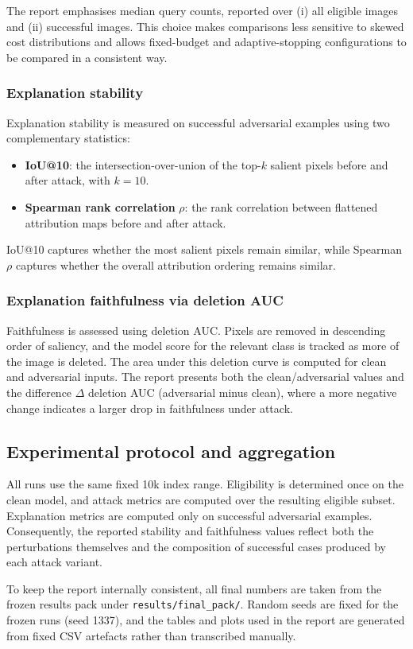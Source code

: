 The report emphasises median query counts, reported over (i) all eligible images and (ii) successful images.
This choice makes comparisons less sensitive to skewed cost distributions and allows fixed-budget and adaptive-stopping configurations to be compared in a consistent way.

\subsubsection{Explanation stability}
Explanation stability is measured on successful adversarial examples using two complementary statistics:
\begin{itemize}
  \item \textbf{IoU@10}: the intersection-over-union of the top-$k$ salient pixels before and after attack, with $k=10$.
  \item \textbf{Spearman rank correlation} $\rho$: the rank correlation between flattened attribution maps before and after attack.
\end{itemize}
IoU@10 captures whether the most salient pixels remain similar, while Spearman $\rho$ captures whether the overall attribution ordering remains similar.

\subsubsection{Explanation faithfulness via deletion AUC}
Faithfulness is assessed using deletion AUC.
Pixels are removed in descending order of saliency, and the model score for the relevant class is tracked as more of the image is deleted.
The area under this deletion curve is computed for clean and adversarial inputs.
The report presents both the clean/adversarial values and the difference $\Delta$ deletion AUC (adversarial minus clean), where a more negative change indicates a larger drop in faithfulness under attack.

\subsection{Experimental protocol and aggregation}
All runs use the same fixed 10k index range.
Eligibility is determined once on the clean model, and attack metrics are computed over the resulting eligible subset.
Explanation metrics are computed only on successful adversarial examples.
Consequently, the reported stability and faithfulness values reflect both the perturbations themselves and the composition of successful cases produced by each attack variant.

To keep the report internally consistent, all final numbers are taken from the frozen results pack under \texttt{results/final\_pack/}.
Random seeds are fixed for the frozen runs (seed 1337), and the tables and plots used in the report are generated from fixed CSV artefacts rather than transcribed manually.
